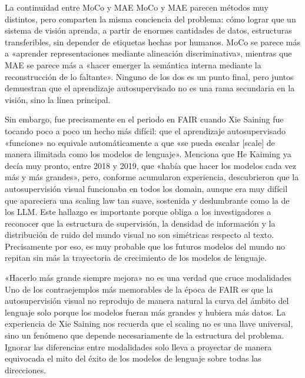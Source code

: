 \documentclass[a4paper,12pt]{article}
\begin{document}
\begin{knowledgebox}{La continuidad entre MoCo y MAE}
MoCo y MAE parecen métodos muy distintos, pero comparten la misma conciencia del problema: cómo lograr que un sistema de visión aprenda, a partir de enormes cantidades de datos, estructuras transferibles, sin depender de etiquetas hechas por humanos. MoCo se parece más a «aprender representaciones mediante alineación discriminativa», mientras que MAE se parece más a «hacer emerger la semántica interna mediante la reconstrucción de lo faltante». Ninguno de los dos es un punto final, pero juntos demuestran que el aprendizaje autosupervisado no es una rama secundaria en la visión, sino la línea principal.
\end{knowledgebox}

Sin embargo, fue precisamente en el periodo en FAIR cuando Xie Saining fue tocando poco a poco un hecho más difícil: que el aprendizaje autosupervisado «funcione» no equivale automáticamente a que «se pueda escalar [scale] de manera ilimitada como los modelos de lenguaje». Menciona que He Kaiming ya decía muy pronto, entre 2018 y 2019, que «había que hacer los modelos cada vez más y más grandes», pero, conforme acumularon experiencia, descubrieron que la autosupervisión visual funcionaba en todos los domain, aunque era muy difícil que apareciera una scaling law tan suave, sostenida y deslumbrante como la de los LLM. Este hallazgo es importante porque obliga a los investigadores a reconocer que la estructura de supervisión, la densidad de información y la distribución de ruido del mundo visual no son simétricas respecto al texto. Precisamente por eso, es muy probable que los futuros modelos del mundo no repitan sin más la trayectoria de crecimiento de los modelos de lenguaje.

\begin{warningbox}{«Hacerlo más grande siempre mejora» no es una verdad que cruce modalidades}
Uno de los contraejemplos más memorables de la época de FAIR es que la autosupervisión visual no reprodujo de manera natural la curva del ámbito del lenguaje solo porque los modelos fueran más grandes y hubiera más datos. La experiencia de Xie Saining nos recuerda que el scaling no es una llave universal, sino un fenómeno que depende necesariamente de la estructura del problema. Ignorar las diferencias entre modalidades solo lleva a proyectar de manera equivocada el mito del éxito de los modelos de lenguaje sobre todas las direcciones.
\end{warningbox}
\end{document}
